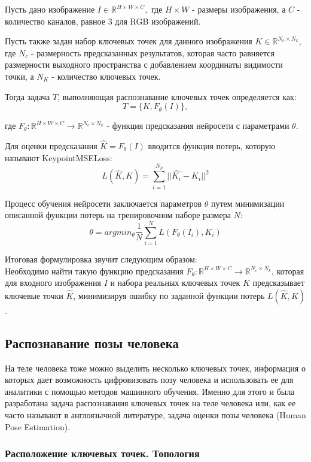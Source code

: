 Пусть дано изображение $I \in \mathbb R^{H \times W \times C},$ где $H \times W$ - размеры изображения, а $C$ - количество каналов, равное 3 для RGB изображений.

Пусть также задан набор ключевых точек для данного изображения $K \in \mathbb R^{N_c \times N_k}$, где $N_c$ - размерность предсказанных результатов, которая часто равняется размерности выходного пространства с добавлением координаты видимости точки, а $N_K$ - количество ключевых точек.

Тогда задача $T$, выполняющая распознавание ключевых точек определяется как:
$$T = \{K, F_{\theta}(I)\},$$

где $F_{\theta}: \mathbb R^{H \times W \times C} \to \mathbb R^{N_c \times N_k}$ - функция предсказания нейросети с параметрами $\theta$.

Для оценки предсказания $\hat{K} = F_{\theta}(I)$ вводится функция потерь, которую называют KeypointMSELoss: $$L(\hat{K}, K) = \sum_{i=1}^{N_k} ||\hat{K_i} - K_i||^2$$ 

\hfill \break

Процесс обучения нейросети заключается параметров $\theta$ путем минимизации описанной функции потерь на тренировочном наборе размера $N$: $$\theta = argmin_{\theta} \frac{1}{N} \sum_{i=1}^{N} L(F_{\theta}(I_i), K_i)$$

Итоговая формулировка звучит следующим образом:\\
Необходимо найти такую функцию предсказания $F_{\theta}: \mathbb R^{H \times W \times C} \to \mathbb R^{N_c \times N_k}$, которая для входного изображения $I$ и набора реальных ключевых точек $K$ предсказывает ключевые точки $\hat{K}$, минимизируя ошибку по заданной функции потерь $L(\hat{K}, K)$. 


\subsection{Распознавание позы человека}

На теле человека тоже можно выделить несколько ключевых точек, информация о которых дает возможность цифровизовать позу человека и использовать ее для аналитики с помощью методов машинного обучения. Именно для этого и была разработана задача распознавания ключевых точек на теле человека  или, как ее часто называют в англоязычной литературе, задача оценки позы человека (Human Pose Estimation).

\subsubsection*{Расположение ключевых точек. Топология}

